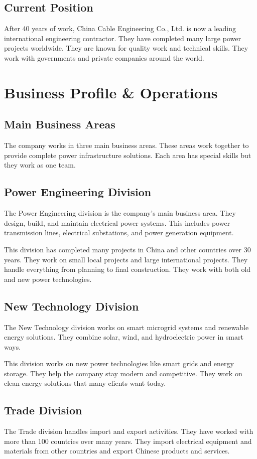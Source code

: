 \subsection{Current Position}
After 40 years of work, China Cable Engineering Co., Ltd. is now a leading international engineering contractor. They have completed many large power projects worldwide. They are known for quality work and technical skills. They work with governments and private companies around the world.

\section{Business Profile \& Operations}

\subsection{Main Business Areas}
The company works in three main business areas. These areas work together to provide complete power infrastructure solutions. Each area has special skills but they work as one team.

\subsection{Power Engineering Division}
The Power Engineering division is the company's main business area. They design, build, and maintain electrical power systems. This includes power transmission lines, electrical substations, and power generation equipment.

This division has completed many projects in China and other countries over 30 years. They work on small local projects and large international projects. They handle everything from planning to final construction. They work with both old and new power technologies.

\subsection{New Technology Division}
The New Technology division works on smart microgrid systems and renewable energy solutions. They combine solar, wind, and hydroelectric power in smart ways.

This division works on new power technologies like smart grids and energy storage. They help the company stay modern and competitive. They work on clean energy solutions that many clients want today.

\subsection{Trade Division}
The Trade division handles import and export activities. They have worked with more than 100 countries over many years. They import electrical equipment and materials from other countries and export Chinese products and services.

